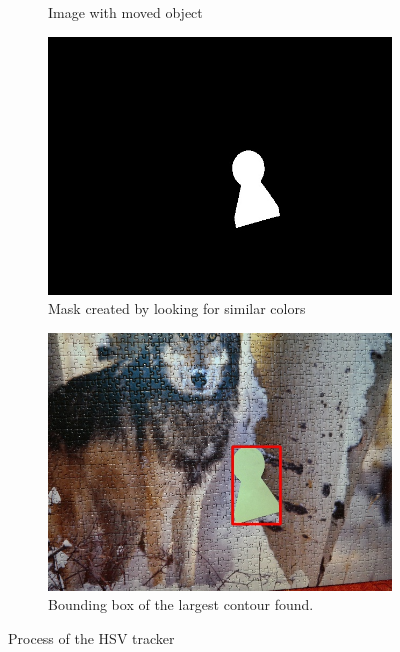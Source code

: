 \begin{figure}
\begin{subfigure}[b]{0.48\linewidth}
    \caption{Image with moved object}
  \end{subfigure}
  \begin{subfigure}[b]{0.48\linewidth}
    \includegraphics[width=\linewidth]{img/hsv/mask.jpg}
    \caption{Mask created by looking for similar colors}
  \end{subfigure}
  \begin{subfigure}[b]{0.48\linewidth}
    \includegraphics[width=\linewidth]{img/hsv/result.jpg}
    \caption{Bounding box of the largest contour found.}
  \end{subfigure}
  \caption{Process of the HSV tracker}
  \label{fig:hsv-tracker}
\end{figure}

